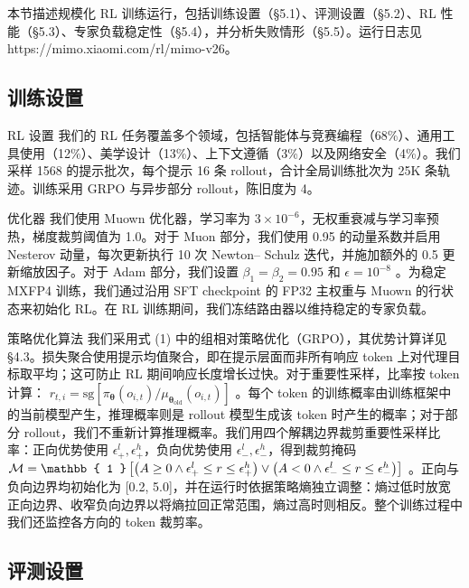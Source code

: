\documentclass[
  10
]{article}
\begin{document}
本节描述规模化 RL 训练运行，包括训练设置（§5.1）、评测设置（§5.2）、RL 性能（§5.3）、专家负载稳定性（§5.4），并分析失败情形（§5.5）。运行日志见 https://mimo.xiaomi.com/rl/mimo-v26。

\subsection{训练设置}\label{training-setup}

RL 设置 我们的 RL 任务覆盖多个领域，包括智能体与竞赛编程（68\%）、通用工具使用（12\%）、美学设计（13\%）、上下文遵循（3\%）以及网络安全（4\%）。我们采样 1568 的提示批次，每个提示 16 条 rollout，合计全局训练批次为 25K 条轨迹。训练采用 GRPO 与异步部分 rollout，陈旧度为 4。

优化器 我们使用 Muown 优化器，学习率为 \(3 \times 1 0 ^ { - 6 }\)，无权重衰减与学习率预热，梯度裁剪阈值为 1.0。对于 Muon 部分，我们使用 0.95 的动量系数并启用 Nesterov 动量，每次更新执行 10 次 Newton-- Schulz 迭代，并施加额外的 0.5 更新缩放因子。对于 Adam 部分，我们设置
\(\beta _ { 1 } = \beta _ { 2 } = 0 . 9 5\) 和
\(\epsilon = 1 0 ^ { - 8 }\) 。为稳定 MXFP4 训练，我们通过沿用 SFT checkpoint 的 FP32 主权重与 Muown 的行状态来初始化 RL。在 RL 训练期间，我们冻结路由器以维持稳定的专家负载。



策略优化算法 我们采用式 (1) 中的组相对策略优化（GRPO），其优势计算详见 §4.3。损失聚合使用提示均值聚合，即在提示层面而非所有响应 token 上对代理目标取平均；这可防止 RL 期间响应长度增长过快。对于重要性采样，比率按 token 计算：
\(r _ { t , i } = \mathrm { s g } [ \pi _ { \boldsymbol { \theta } } ( o _ { i , t } ) / \mu _ { \boldsymbol { \theta } _ { \mathrm { o l d } } } ( o _ { i , t } ) ]\)
。每个 token 的训练概率由训练框架中的当前模型产生，推理概率则是 rollout 模型生成该 token 时产生的概率；对于部分 rollout，我们不重新计算推理概率。我们用四个解耦边界裁剪重要性采样比率：正向优势使用
\(\epsilon _ { + } ^ { l } , \epsilon _ { + } ^ { h }\)，负向优势使用 \(\epsilon _ { - } ^ { l } , \epsilon _ { - } ^ { h }\)，得到裁剪掩码
\({ \cal M } = \mathbb { 1 } \left[ \big ( A \ge 0 \land \epsilon _ { + } ^ { l } \le r \le \epsilon _ { + } ^ { h } \big ) \lor \big ( A < 0 \land \epsilon _ { - } ^ { l } \le r \le \epsilon _ { - } ^ { h } \big ) \right]\)
。正向与负向边界均初始化为 {[}0.2, 5.0{]}，并在运行时依据策略熵独立调整：熵过低时放宽正向边界、收窄负向边界以将熵拉回正常范围，熵过高时则相反。整个训练过程中我们还监控各方向的 token 裁剪率。

\subsection{评测设置}\label{evaluation-settings}
\end{document}
